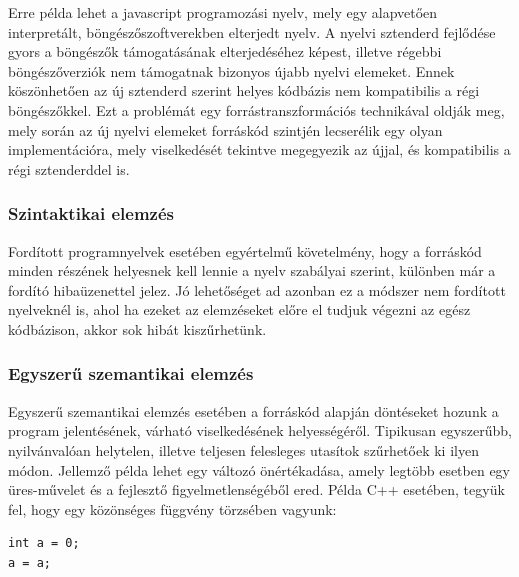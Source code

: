 \documentclass[a4paper,12pt]{report}
\begin{document}
Erre példa lehet a javascript programozási nyelv, mely egy alapvetően interpretált, böngészőszoftverekben elterjedt nyelv. A nyelvi sztenderd fejlődése gyors a böngészők támogatásának elterjedéséhez képest, illetve régebbi böngészőverziók nem támogatnak bizonyos újabb nyelvi elemeket. Ennek köszönhetően az új sztenderd szerint helyes kódbázis nem kompatibilis a régi böngészőkkel. Ezt a problémát egy forrástranszformációs technikával \cite{transpilation} oldják meg, mely során az új nyelvi elemeket forráskód szintjén lecserélik egy olyan implementációra, mely viselkedését tekintve megegyezik az újjal, és kompatibilis a régi sztenderddel is.

\subsubsection{Szintaktikai elemzés}
Fordított programnyelvek esetében egyértelmű követelmény, hogy a forráskód minden részének helyesnek kell lennie a nyelv szabályai szerint, különben már a fordító hibaüzenettel jelez. Jó lehetőséget ad azonban ez a módszer nem fordított nyelveknél is, ahol ha ezeket az elemzéseket előre el tudjuk végezni az egész kódbázison, akkor sok hibát kiszűrhetünk.
\subsubsection{Egyszerű szemantikai elemzés}
Egyszerű szemantikai elemzés esetében a forráskód alapján döntéseket hozunk a program jelentésének, várható viselkedésének helyességéről. Tipikusan egyszerűbb, nyilvánvalóan helytelen, illetve teljesen felesleges utasítok szűrhetőek ki ilyen módon. Jellemző példa lehet egy változó önértékadása, amely legtöbb esetben egy üres-művelet és a fejlesztő figyelmetlenségéből ered.
Példa C++ esetében, tegyük fel, hogy egy közönséges függvény törzsében vagyunk:
\begin{lstlisting}
int a = 0;
a = a;
\end{lstlisting}
\end{document}
